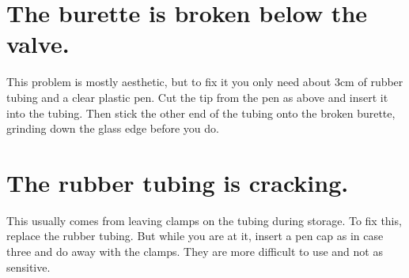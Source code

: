 \section{The burette is broken below the valve.}
This problem is mostly aesthetic, 
but to fix it you only need about 3cm of rubber tubing 
and a clear plastic pen. 
Cut the tip from the pen as above and insert it into the tubing. 
Then stick the other end of the tubing onto the broken burette, 
grinding down the glass edge before you do.

\section{The rubber tubing is cracking.}
This usually comes from leaving clamps on the tubing during storage. 
To fix this, 
replace the rubber tubing. 
But while you are at it, 
insert a pen cap as in case three and do away with the clamps. 
They are more difficult to use and not as sensitive.
